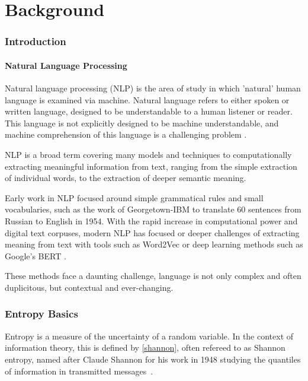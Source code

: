 \chapter{Background \label{ch:background}}

\subsection{Introduction}

\subsubsection{Natural Language Processing} 

Natural language processing (NLP) is the area of study in which 'natural' human language is examined via machine. Natural language refers to either spoken or written language, designed to be understandable to a human listener or reader. This language is not explicitly designed to be machine understandable, and machine comprehension of this language is a challenging problem .

NLP is a broad term covering many models and techniques to computationally extracting meaningful information from text, ranging from the simple extraction of individual words, to the extraction of deeper semantic meaning. 

Early work in NLP focused around simple grammatical rules and small vocabularies, such as the work of Georgetown-IBM  to translate 60 sentences from Russian to English in 1954. With the rapid increase in computational power and digital text corpuses, modern NLP has focused or deeper challenges of extracting meaning from text with tools such as Word2Vec  or deep learning methods such as Google's BERT .

These methods face a daunting challenge, language is not only complex and often duplicitous, but contextual and ever-changing. 


\subsection{Entropy Basics}
Entropy is a measure of the uncertainty of a random variable. In the context of information theory, this is defined by \autoref{shannon}, often refereed to as Shannon entropy, named after Claude Shannon for his work in 1948 studying the quantiles of information in transmitted messages~.

